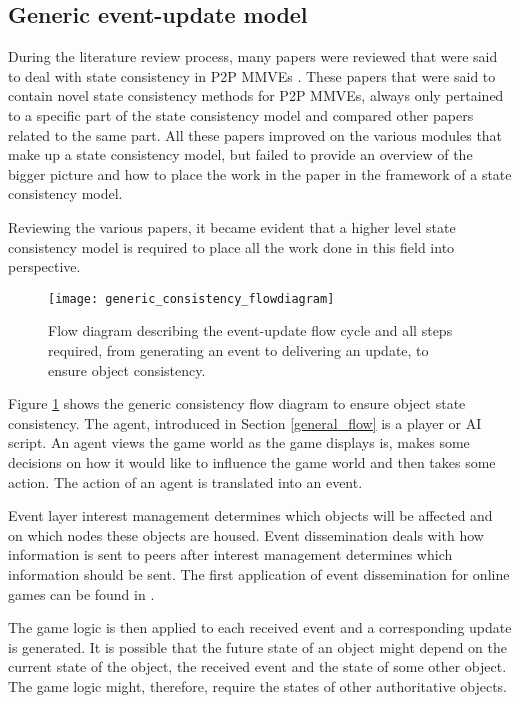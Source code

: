 \subsection{Generic event-update model}
\label{generic_event_update_model}

During the literature review process, many papers were reviewed that were said to deal with state consistency in P2P MMVEs \cite{}. These papers that were said to contain novel state consistency methods for P2P MMVEs, always only pertained to a specific part of the state consistency model and compared other papers related to the same part. All these papers improved on the various modules that make up a state consistency model, but failed to provide an overview of the bigger picture and how to place the work in the paper in the framework of a state consistency model.

Reviewing the various papers, it became evident that a higher level state consistency model is required to place all the work done in this field into perspective.

\begin{figure}[htbp]
 \centering
 \texttt{[image: generic\_consistency\_flowdiagram]}
 \caption{Flow diagram describing the event-update flow cycle and all steps required, from generating an event to delivering an update, to ensure object consistency.}
 \label{fig_event_update_flowdiagram}
\end{figure}

Figure \ref{fig_event_update_flowdiagram} shows the generic consistency flow diagram to ensure object state consistency. The agent, introduced in Section \ref{general_flow} is a player or AI script. An agent views the game world as the game displays is, makes some decisions on how it would like to influence the game world and then takes some action. The action of an agent is translated into an event.

Event layer interest management determines which objects will be affected and on which nodes these objects are housed. Event dissemination deals with how information is sent to peers after interest management determines which information should be sent. The first application of event dissemination for online games can be found in \cite{first_GED}.

The game logic is then applied to each received event and a corresponding update is generated. It is possible that the future state of an object might depend on the current state of the object, the received event and the state of some other object. The game logic might, therefore, require the states of other authoritative objects.

